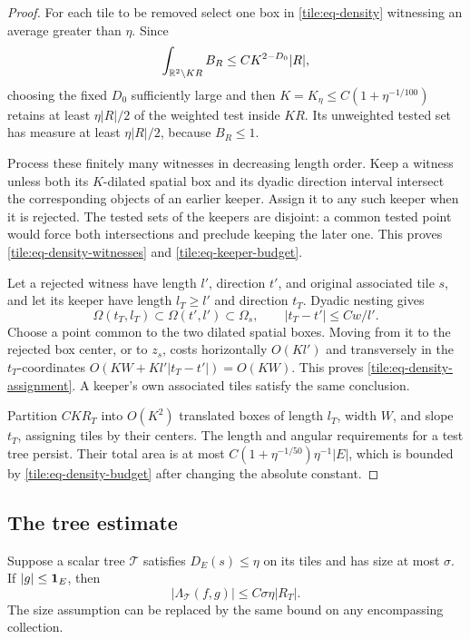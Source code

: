 \begin{proof}
For each tile to be removed select one box in
\eqref{tile:eq-density} witnessing an average greater
than \(\eta\).  Since
\[
 \int_{\mathbb R^2\setminus KR}B_R\leq C K^{2-D_0}|R|,
\]
choosing the fixed \(D_0\) sufficiently large and then
\(K=K_\eta\leq C(1+\eta^{-1/100})\) retains at least
\(\eta|R|/2\) of the weighted test inside \(KR\).
Its unweighted tested set has measure at least
\(\eta|R|/2\), because \(B_R\leq1\).

Process these finitely many witnesses in decreasing
length order.  Keep a witness unless both its
\(K\)-dilated spatial box and its dyadic direction
interval intersect the corresponding objects of an
earlier keeper.  Assign it to any such keeper when
it is rejected.  The tested sets of the keepers are
disjoint: a common tested point would force both
intersections and preclude keeping the later one.
This proves \eqref{tile:eq-density-witnesses} and
\eqref{tile:eq-keeper-budget}.

Let a rejected witness have length \(l'\), direction
\(t'\), and original associated tile \(s\), and let
its keeper have length \(l_T\geq l'\) and direction
\(t_T\).  Dyadic nesting gives
\[
 \Omega(t_T,l_T)\subset\Omega(t',l')\subset\Omega_s,
 \qquad |t_T-t'|\leq Cw/l'.
\]
Choose a point common to the two dilated spatial
boxes.  Moving from it to the rejected box center,
or to \(z_s\), costs horizontally \(O(Kl')\) and
transversely in the \(t_T\)-coordinates
\(O(KW+K l'|t_T-t'|)=O(KW)\).  This proves
\eqref{tile:eq-density-assignment}.  A keeper's own
associated tiles satisfy the same conclusion.

Partition \(CKR_T\) into \(O(K^2)\) translated
boxes of length \(l_T\), width \(W\), and slope
\(t_T\), assigning tiles by their centers.
The length and angular requirements for a test
tree persist.  Their total area is at most
\(C(1+\eta^{-1/50})\eta^{-1}|E|\), which is bounded
by \eqref{tile:eq-density-budget} after changing
the absolute constant.
\end{proof}

\subsection{The tree estimate}

\begin{lemma}\label{tile:lem-tree}
Suppose a scalar tree \(\mathcal T\) satisfies
\(D_E(s)\leq\eta\) on its tiles and has size at
most \(\sigma\).  If \(|g|\leq\mathbf 1_E\), then
\begin{equation}\label{tile:eq-tree-bound}
 |\Lambda_{\mathcal T}(f,g)|
           \leq C\sigma\eta|R_T|.
\end{equation}
The size assumption can be replaced by the same
bound on any encompassing collection.
\end{lemma}

